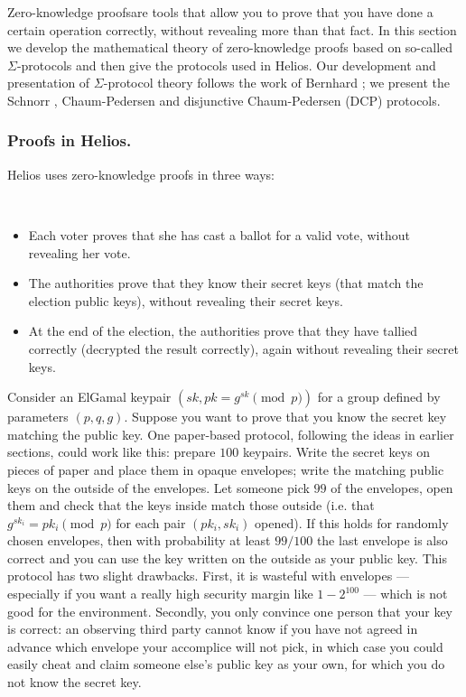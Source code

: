 \documentclass[envcountsame]{llncs}
\newenvironment{helios}{\begin{framed}
\vspace{-18pt}
\begin{figure}
\vspace{-12pt}\quad{\Huge \Sun}
\end{figure}}{\end{framed}}
\begin{document}
Zero-knowledge proofs\footnotemark are tools that allow you to prove that you
have done a certain operation correctly, without revealing more than that fact.
In this section we develop the mathematical theory of zero-knowledge proofs
based on so-called $\Sigma$-protocols and then give the protocols used in
Helios. Our development and presentation of $\Sigma$-protocol theory follows the
work of Bernhard \cite{B14}; we present the Schnorr \cite{S91},
Chaum-Pedersen \cite{CP92} and disjunctive Chaum-Pedersen (DCP) protocols.

\begin{helios}
\subsubsection{Proofs in Helios.}
Helios uses zero-knowledge proofs in three ways:
\vspace{6pt}

\hspace{-12pt}\ %
\begin{minipage}{0.8\textwidth}
\begin{itemize}
\item Each voter proves that she has cast a ballot for a valid vote, without
revealing her vote.
\item The authorities prove that they know their secret keys (that match the
election public keys), without revealing their secret keys.
\item At the end of the election, the authorities prove that they have tallied
correctly (decrypted the result correctly), again without revealing their secret
keys.
\end{itemize}
\end{minipage}
\end{helios}

Consider an ElGamal keypair $(sk, pk = g^{sk} \pmod{p})$ for a group defined by
parameters $(p, q, g)$. Suppose you want to prove that you know the secret key
matching the public key. One paper-based protocol, following the ideas in
earlier sections, could work like this: prepare $100$ keypairs. Write the secret
keys on pieces of paper and place them in opaque envelopes; write the matching
public keys on the outside of the envelopes. Let someone pick $99$ of the
envelopes, open them and check that the keys inside match those outside (i.e.
that $g^{sk_i} = pk_i \pmod{p}$ for each pair $(pk_i, sk_i)$ opened). If this
holds for randomly chosen envelopes, then with probability at least $99/100$ the
last envelope is also correct and you can use the key written on the outside as
your public key. This protocol has two slight drawbacks. First, it is wasteful
with envelopes --- especially if you want a really high security margin like
$1 - 2^{100}$ --- which is not good for the environment. Secondly, you only
convince one person that your key is correct: an observing third party cannot
know if you have not agreed in advance which envelope your accomplice will not
pick, in which case you could easily cheat and claim someone else's public key
as your own, for which you do not know the secret key.
\end{document}
